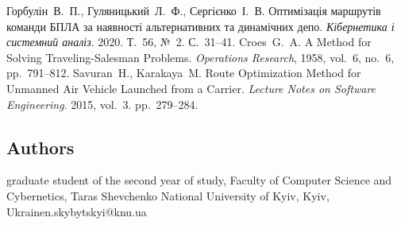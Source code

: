 \documentclass{SHVpaper}
\begin{document}
\begin{thebibliography}{5}
 Горбулін~В.~П., Гуляницький~Л.~Ф., Сергієнко~І.~В. Оптимізація маршрутів команди БПЛА за наявності альтернативних та динамічних депо. \emph{Кібернетика і системний аналіз}. 2020. Т.~56, №~2. С.~31--41.
 Croes~G.~A. A Method for Solving Traveling-Salesman Problems. \emph{Operations Research}, 1958, vol.~6, no.~6, pp.~791--812.
 Savuran~H., Karakaya~M. Route Optimization Method for Unmanned Air Vehicle Launched from a Carrier. \emph{Lecture Notes on Software Engineering}. 2015, vol.~3. pp.~279--284. 
\end{thebibliography}

\subsection{Authors}
\author{Nikita Skybytskyi}{graduate student of the second year of study, Faculty of Computer Science and Cybernetics, Taras Shevchenko National University of Kyiv, Kyiv, Ukraine}{n.skybytskyi@knu.ua}
\end{document}
